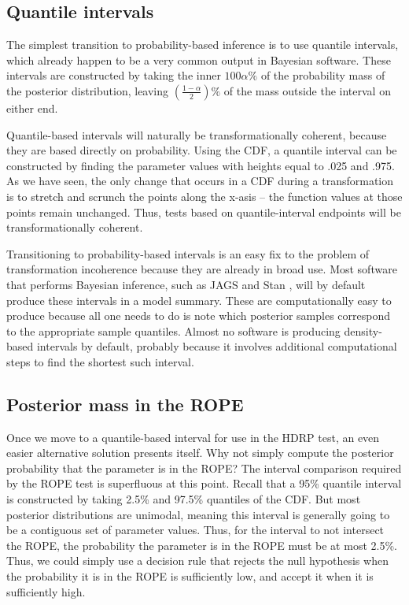 \documentclass[9pt,twocolumn,twoside]{cidlab-draft}\templatetype{cidlab-invited}
\newcommand{\hdr}{HDRP}
\begin{document}
\subsection*{Quantile intervals}

The simplest transition to probability-based inference is to use quantile intervals, which already happen to be a very common output in Bayesian software.  These intervals are constructed by taking the inner $100\alpha\%$ of the probability mass of the posterior distribution, leaving $\left(\frac{1-\alpha}{2}\right)\!\!\%$ of the mass outside the interval on either end. 

Quantile-based intervals will naturally be transformationally coherent, because they are based directly on probability. Using the CDF, a quantile interval can be constructed by finding the parameter values with heights equal to .025 and .975. As we have seen, the only change that occurs in a CDF during a transformation is to stretch and scrunch the points along the x-asis -- the function values at those points remain unchanged. Thus, tests based on quantile-interval endpoints will be transformationally coherent.

Transitioning to probability-based intervals is an easy fix to the problem of transformation incoherence because they are already in broad use. Most software that performs Bayesian inference, such as JAGS \cite{PlummerEtAl2006} and Stan \cite{carpenter2017stan}, will by default produce these intervals in a model summary. These are computationally easy to produce because all one needs to do is note which posterior samples correspond to the appropriate sample quantiles. Almost no software is producing density-based intervals by default, probably because it involves additional computational steps to find the shortest such interval.


\subsection*{Posterior mass in the ROPE}

Once we move to a quantile-based interval for use in the \hdr{} test, an even easier alternative solution presents itself. Why not simply compute the posterior probability that the parameter is in the ROPE? The interval comparison required by the ROPE test is superfluous at this point. Recall that a 95\% quantile interval is constructed by taking 2.5\% and 97.5\% quantiles of the CDF. But most posterior distributions are unimodal, meaning this interval is generally going to be a contiguous set of parameter values. Thus, for the interval to not intersect the ROPE, the probability the parameter is in the ROPE must be at most 2.5\%. Thus, we could simply use a decision rule that rejects the null hypothesis when the probability it is in the ROPE is sufficiently low, and accept it when it is sufficiently high. 
\end{document}
